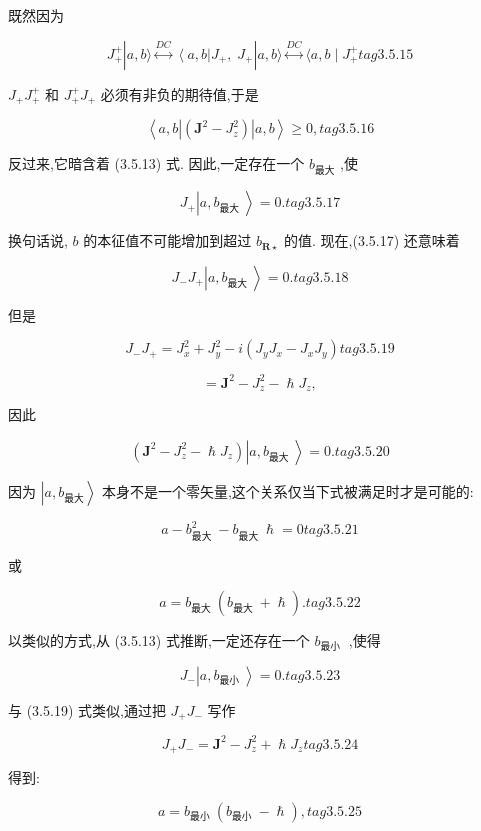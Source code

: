 既然因为

$$
{J}_{ + }^{ + }\left| {a, b\rangle \overset{DC}{ \leftrightarrow }\left\langle {a, b}\right| {J}_{ + },\;{J}_{ + }}\right| a, b\rangle \overset{DC}{ \leftrightarrow }\langle a, b \mid {J}_{ + }^{ + } tag{3. 5.15}
$$

${J}_{ + }{J}_{ + }^{ + }$ 和 ${J}_{ + }^{ + }{J}_{ + }$ 必须有非负的期待值,于是

$$
\left\langle {a, b\left| \left( {{\mathbf{J}}^{2} - {J}_{z}^{2}}\right) \right| a, b}\right\rangle \geq 0, tag{3. 5.16}
$$

反过来,它暗含着 (3.5.13) 式. 因此,一定存在一个 ${b}_{最大}$ ,使

$$
{J}_{ + }\left| {a,{b}_{\text{最大 }}}\right\rangle = 0. tag{3.5.17}
$$

换句话说, $b$ 的本征值不可能增加到超过 ${b}_{\mathbf{R} \star }$ 的值. 现在,(3.5.17) 还意味着

$$
{J}_{ - }{J}_{ + }\left| {a,{b}_{\text{最大 }}}\right\rangle = 0. tag{3. 5.18}
$$

但是

$$
{J}_{ - }{J}_{ + } = {J}_{x}^{2} + {J}_{y}^{2} - i\left( {{J}_{y}{J}_{x} - {J}_{x}{J}_{y}}\right) tag{3.5.19}
$$

$$
= {\mathbf{J}}^{2} - {J}_{z}^{2} - \hslash {J}_{z},
$$

因此

$$
\left( {{\mathbf{J}}^{2} - {J}_{z}^{2} - \hslash {J}_{z}}\right) \left| {a,{b}_{\text{最大 }}}\right\rangle = 0. tag{3. 5.20}
$$

因为 $\left| {a,{b}_{最大}}\right\rangle$ 本身不是一个零矢量,这个关系仅当下式被满足时才是可能的:

$$
a - {b}_{\text{最大 }}^{2} - {b}_{\text{最大 }}\hslash = 0 tag{3. 5.21}
$$

或

$$
a = {b}_{\text{最大 }}\left( {{b}_{\text{最大 }} + \hslash }\right) . tag{3. 5.22}
$$

以类似的方式,从 (3.5.13) 式推断,一定还存在一个 ${b}_{\text{最小 }}$ ,使得

$$
{J}_{ - }\left| {a,{b}_{\text{最小 }}}\right\rangle = 0. tag{3. 5.23}
$$

与 (3.5.19) 式类似,通过把 ${J}_{ + }{J}_{ - }$ 写作

$$
{J}_{ + }{J}_{ - } = {\mathbf{J}}^{2} - {J}_{z}^{2} + \hslash {J}_{z} tag{3. 5.24}
$$

得到:

$$
a = {b}_{\text{最小 }}\left( {{b}_{\text{最小 }} - \hslash }\right) , tag{3. 5.25}
$$

